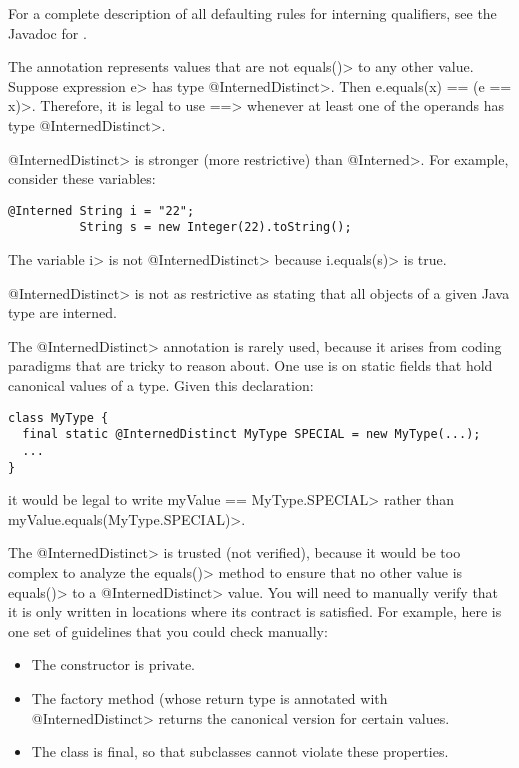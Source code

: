 For a complete description of all defaulting rules for interning qualifiers, see the
Javadoc for .


The  annotation
represents values that are not \<equals()> to any other value.  Suppose
expression \<e> has type \<@InternedDistinct>.  Then \<e.equals(x) == (e ==
x)>.  Therefore, it is legal to use \<==> whenever at least one of the
operands has type \<@InternedDistinct>.

\<@InternedDistinct> is stronger (more restrictive) than \<@Interned>.
For example, consider these variables:

\begin{Verbatim}
@Interned String i = "22";
          String s = new Integer(22).toString();
\end{Verbatim}

\noindent
The variable \<i> is not \<@InternedDistinct> because \<i.equals(s)> is true.

\<@InternedDistinct> is not as restrictive as stating that all objects of a
given Java type are interned.

The \<@InternedDistinct> annotation is rarely used, because it arises from
coding paradigms that are tricky to reason about.
%
One use is on static fields
that hold canonical values of a type.
Given this declaration:

\begin{Verbatim}
class MyType {
  final static @InternedDistinct MyType SPECIAL = new MyType(...);
  ...
}
\end{Verbatim}

\noindent
it would be legal to write \<myValue == MyType.SPECIAL> rather than
\<myValue.equals(MyType.SPECIAL)>.

The \<@InternedDistinct> is trusted (not verified), because it would be too
complex to analyze the \<equals()> method to ensure that no other value is
\<equals()> to a \<@InternedDistinct> value.  You will need to manually
verify that it is only written in locations where its contract is satisfied.
For example, here is one set of guidelines that you could check manually:
\begin{itemize}
\item The constructor is private.
\item The factory method (whose return type is annotated with
  \<@InternedDistinct> returns the canonical version for certain values.
\item The class is final, so that subclasses cannot violate these properties.
\end{itemize}


